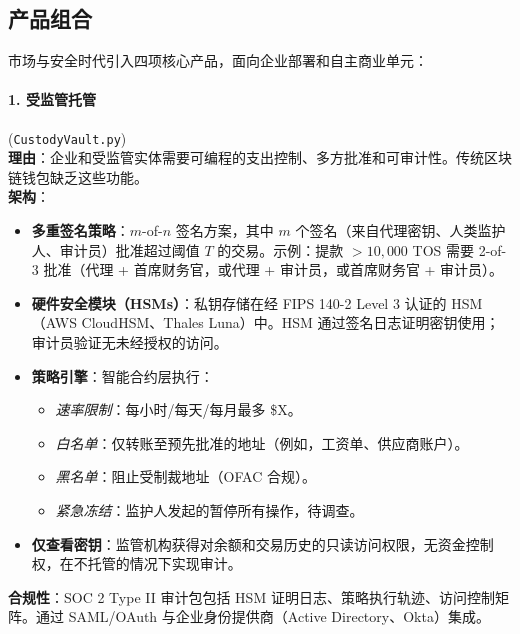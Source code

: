 \documentclass[11pt]{article}
\begin{document}
\subsection{产品组合}
市场与安全时代引入四项核心产品，面向企业部署和自主商业单元：

\paragraph{1. 受监管托管} (\texttt{CustodyVault.py})\\
\textbf{理由}：企业和受监管实体需要可编程的支出控制、多方批准和可审计性。传统区块链钱包缺乏这些功能。\\
\textbf{架构}：
\begin{itemize}[noitemsep]
  \item \textbf{多重签名策略}：$m$-of-$n$ 签名方案，其中 $m$ 个签名（来自代理密钥、人类监护人、审计员）批准超过阈值 $T$ 的交易。示例：提款 $>10,000$ TOS 需要 2-of-3 批准（代理 + 首席财务官，或代理 + 审计员，或首席财务官 + 审计员）。
  \item \textbf{硬件安全模块（HSMs）}：私钥存储在经 FIPS 140-2 Level 3 认证的 HSM（AWS CloudHSM、Thales Luna）中。HSM 通过签名日志证明密钥使用；审计员验证无未经授权的访问。
  \item \textbf{策略引擎}：智能合约层执行：
    \begin{itemize}[noitemsep]
      \item \emph{速率限制}：每小时/每天/每月最多 \$X。
      \item \emph{白名单}：仅转账至预先批准的地址（例如，工资单、供应商账户）。
      \item \emph{黑名单}：阻止受制裁地址（OFAC 合规）。
      \item \emph{紧急冻结}：监护人发起的暂停所有操作，待调查。
    \end{itemize}
  \item \textbf{仅查看密钥}：监管机构获得对余额和交易历史的只读访问权限，无资金控制权，在不托管的情况下实现审计。
\end{itemize}
\textbf{合规性}：SOC 2 Type II 审计包包括 HSM 证明日志、策略执行轨迹、访问控制矩阵。通过 SAML/OAuth 与企业身份提供商（Active Directory、Okta）集成。
\end{document}
